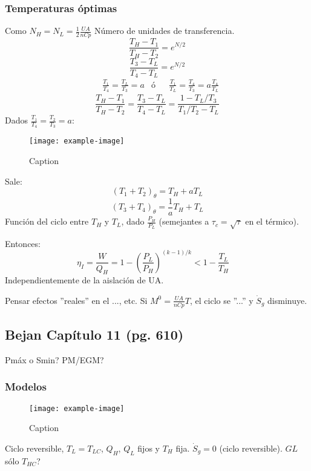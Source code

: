 \documentclass{article}
\begin{document}
\subsubsection{Temperaturas óptimas}
Como $N_H=N_L=\frac{1}{2}\frac{UA}{nCp}$ Número de unidades de transferencia.
\begin{equation}
    \frac{T_H-T_1}{T_H-T_2}=e^{N/2}
\end{equation}
\begin{equation}
    \frac{T_3-T_L}{T_4-T_L}=e^{N/2}
\end{equation}
\begin{align}
    &\frac{T_1}{T_4}=\frac{T_L}{T_3}=a &\text{ó} && \frac{T_1}{T_L}=\frac{T_4}{T_3}=a\frac{T_4}{T_L}
\end{align}
\begin{equation}
    \frac{T_H-T_1}{T_H-T_2}=\frac{T_3-T_L}{T_4-T_L}=\frac{1-T_L/T_3}{T_1/T_2-T_L}
\end{equation}
Dados $\frac{T_1}{T_4}=\frac{T_2}{T_3}=a$:
\begin{figure}[H]
    \centering
    \texttt{[image: example-image]}
    \caption{Caption}
\end{figure}
Sale:
\begin{equation}
    \left(T_1+T_2\right)_{\theta}=T_H+aT_L
\end{equation}
\begin{equation}
    \left(T_3+T_4\right)_{\theta}=\frac{1}{a}T_H+T_L
\end{equation}
Función del ciclo entre $T_H$ y $T_L$, dado $\frac{P_H}{P_L}$ (semejantes a $\tau_c=\sqrt{\tau}$ en el térmico).

Entonces:
\begin{equation}
    \eta_I=\frac{W}{Q_H}=1-\left(\frac{P_L}{P_H}\right)^{\left(k-1\right)/k}<1-\frac{T_L}{T_H}\quad
\end{equation}
Independientemente de la aislación de UA.

Pensar efectos ''reales'' en el ..., etc. Si $M^0=\frac{UA}{nCp}T$, el ciclo se ''...'' y $\dot{S}_g$ disminuye.
\subsection{Bejan Capítulo 11 (pg. 610)}
Pmáx o Smin? PM/EGM?
\subsubsection{Modelos}
\begin{figure}[H]
    \centering
    \texttt{[image: example-image]}
    \caption{Caption}
\end{figure}
Ciclo reversible, $T_L=T_{LC}$, $Q_H$, $Q_L$ fijos y $T_H$ fija. $\dot{S}_g=0$ (ciclo reversible).
$GL$ sólo $T_{HC}$?
\end{document}
